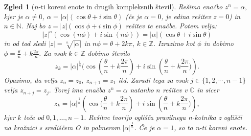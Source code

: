 \documentclass[10pt, a4paper]{article}
\newtheorem{zgled}[izr]{Zgled}
\newcommand{\N}{\mathbb {N}}
\newcommand{\Z}{\mathbb {Z}}
\newcommand{\C}{\mathbb {C}}
\begin{document}
\begin{zgled}[$n$-ti koreni enote in drugih kompleksnih števil]
    Rešimo enačbo $z^n = \alpha,$ kjer je $\alpha \neq 0$, $\alpha = |\alpha|(\cos \theta + i\sin \theta)$ (če je $\alpha = 0$, je edina rešitev $z=0$) in $n \in \N$.
    Naj bo $z = |z|(\cos \phi + i \sin \phi)$ rešitev te enačbe. Potem velja:
    $$|z|^n(\cos (n\phi) + i \sin (n\phi)) = |\alpha|(\cos \theta + i\sin \theta)$$
    in od tod sledi $|z| = \sqrt[n]{|\alpha|}$ in $n\phi = \theta + 2 k\pi,\ k \in \Z$.
    Izrazimo kot $\phi$ in dobimo 
    $\phi = \frac{\theta}{n} + k\frac{2\pi}{n}.$ 
    Za vsak $k \in \Z$ dobimo število 
    $$z_k = |\alpha|^{\frac{1}{n}} (\cos\left(\frac{\theta}{n} + k\frac{2\pi}{n}\right) + i \sin\left(\frac{\theta}{n} + k\frac{2\pi}{n})\right).$$
    Opazimo, da velja $z_n = z_0,\ z_{n+1} = z_1$ itd. 
    Zaradi tega za vsak $ j \in \{1,2,\cdots,n-1\}$ velja $z_{n+j} = z_j.$
    Torej ima enačba $z^n = \alpha$ natanko $n$ rešitev v $\C$ in sicer 
    $$z_k = |\alpha|^{\frac{1}{n}} \left(\cos(\frac{\theta}{n} + k\frac{2\pi}{n}\right) + i \sin\left(\frac{\theta}{n} + k\frac{2\pi}{n})\right),$$ 
    kjer $k$ teče od $0,1,\dots,n-1$. Rešitve tvorijo oglišča pravilnega n-kotnika z oglišči na krožnici s središčem O in polmerom $|\alpha|^{\frac{1}{n}}$. Če je $\alpha = 1$, so to n-ti koreni enote.
\end{zgled}
\end{document}
